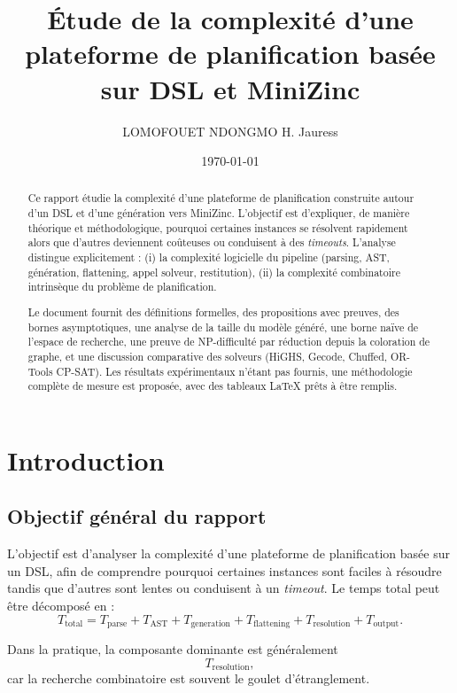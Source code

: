 \documentclass[12pt,a4paper]{article}
\title{Étude de la complexité d'une plateforme de planification basée sur DSL et MiniZinc}
\author{LOMOFOUET NDONGMO H. Jauress}
\date{\today}
\begin{document}
\maketitle
\thispagestyle{empty}
\clearpage

\begin{abstract}
Ce rapport étudie la complexité d'une plateforme de planification construite autour d'un DSL et d'une génération vers MiniZinc. L'objectif est d'expliquer, de manière théorique et méthodologique, pourquoi certaines instances se résolvent rapidement alors que d'autres deviennent coûteuses ou conduisent à des \textit{timeouts}. L'analyse distingue explicitement : (i) la complexité logicielle du pipeline (parsing, AST, génération, flattening, appel solveur, restitution), (ii) la complexité combinatoire intrinsèque du problème de planification.

Le document fournit des définitions formelles, des propositions avec preuves, des bornes asymptotiques, une analyse de la taille du modèle généré, une borne naïve de l'espace de recherche, une preuve de NP-difficulté par réduction depuis la coloration de graphe, et une discussion comparative des solveurs (HiGHS, Gecode, Chuffed, OR-Tools CP-SAT). Les résultats expérimentaux n'étant pas fournis, une méthodologie complète de mesure est proposée, avec des tableaux LaTeX prêts à être remplis.
\end{abstract}

\tableofcontents
\clearpage

\section{Introduction}

\subsection{Objectif général du rapport}
L'objectif est d'analyser la complexité d'une plateforme de planification basée sur un DSL, afin de comprendre pourquoi certaines instances sont faciles à résoudre tandis que d'autres sont lentes ou conduisent à un \textit{timeout}. Le temps total peut être décomposé en :
\begin{equation}
T_{\text{total}} = T_{\text{parse}} + T_{\text{AST}} + T_{\text{generation}} + T_{\text{flattening}} + T_{\text{resolution}} + T_{\text{output}}.
\end{equation}

Dans la pratique, la composante dominante est généralement
\begin{equation}
T_{\text{resolution}},
\end{equation}
car la recherche combinatoire est souvent le goulet d'étranglement.
\end{document}
